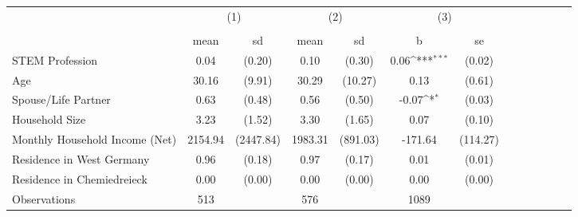 {
\def\sym#1{\ifmmode^{#1}\else\(^{#1}\)\fi}
\begin{tabular}{l*{3}{cccc}}
\hline\hline
                    &\multicolumn{2}{c}{(1)}  &\multicolumn{2}{c}{(2)}  &\multicolumn{2}{c}{(3)}           \\
                    &\multicolumn{2}{c}{}     &\multicolumn{2}{c}{}     &\multicolumn{2}{c}{}              \\
                    &        mean&          sd&        mean&          sd&           b         &          se\\
\hline
STEM Profession     &        0.04&      (0.20)&        0.10&      (0.30)&        0.06\sym{***}&      (0.02)\\
Age                 &       30.16&      (9.91)&       30.29&     (10.27)&        0.13         &      (0.61)\\
Spouse/Life Partner &        0.63&      (0.48)&        0.56&      (0.50)&       -0.07\sym{*}  &      (0.03)\\
Household Size      &        3.23&      (1.52)&        3.30&      (1.65)&        0.07         &      (0.10)\\
Monthly Household Income (Net)&     2154.94&   (2447.84)&     1983.31&    (891.03)&     -171.64         &    (114.27)\\
Residence in West Germany&        0.96&      (0.18)&        0.97&      (0.17)&        0.01         &      (0.01)\\
Residence in Chemiedreieck&        0.00&      (0.00)&        0.00&      (0.00)&        0.00         &      (0.00)\\
\hline
Observations        &         513&            &         576&            &        1089         &            \\
\hline\hline
\end{tabular}
}
